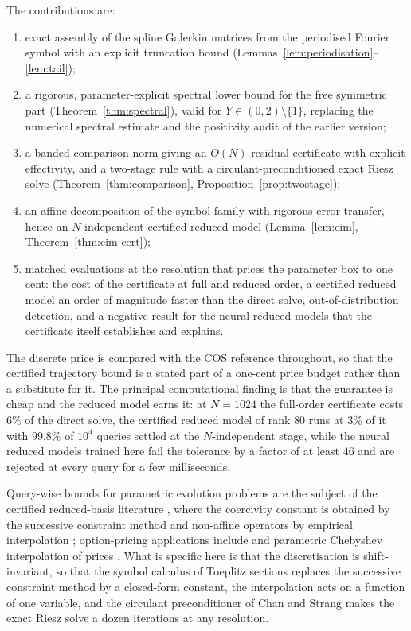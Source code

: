 \documentclass[11pt]{amsart}
\theoremstyle{remark}
\begin{document}
The contributions are:
\begin{enumerate}[leftmargin=2em]
\item exact assembly of the spline Galerkin matrices from the periodised
Fourier symbol with an explicit truncation bound (Lemmas~\ref{lem:periodisation}--\ref{lem:tail});
\item a rigorous, parameter-explicit spectral lower bound for the free symmetric part
(Theorem~\ref{thm:spectral}), valid for $Y\in(0,2)\setminus\{1\}$, replacing the
numerical spectral estimate and the positivity audit of the earlier version;
\item a banded comparison norm giving an $O(N)$ residual certificate with explicit effectivity,
and a two-stage rule with a circulant-preconditioned exact Riesz solve
(Theorem~\ref{thm:comparison}, Proposition~\ref{prop:twostage});
\item an affine decomposition of the symbol family with rigorous error transfer, hence an
$N$-independent certified reduced model (Lemma~\ref{lem:eim}, Theorem~\ref{thm:eim-cert});
\item matched evaluations at the resolution that prices the parameter box to one cent: the cost
of the certificate at full and reduced order, a certified reduced model an order of magnitude
faster than the direct solve, out-of-distribution detection, and a negative result for the neural
reduced models that the certificate itself establishes and explains.
\end{enumerate}
The discrete price is compared with the COS reference \cite{FangOosterlee2008} throughout, so that
the certified trajectory bound is a stated part of a one-cent price budget rather than a substitute
for it.
The principal computational finding is that the guarantee is cheap and the reduced model
earns it: at $N=1024$ the full-order certificate costs $6\%$ of the direct solve, the certified
reduced model of rank $80$ runs at $3\%$ of it with $99.8\%$ of $10^4$ queries settled at the
$N$-independent stage, while the neural reduced models trained here fail the tolerance by a
factor of at least $46$ and are rejected at every query for a few milliseconds.

Query-wise bounds for parametric evolution problems are the subject of the certified
reduced-basis literature \cite{GreplPatera2005,RozzaHuynhPatera2008,HaasdonkOhlberger2008},
where the coercivity constant is obtained by the successive constraint method
\cite{HuynhRozzaSenPatera2007} and non-affine operators by empirical interpolation
\cite{BarraultMadayNguyenPatera2004,GreplMadayNguyenPatera2007}; option-pricing applications
include \cite{ContLantosPironneau2011,BurkovskaHaasdonkSalomonWohlmuth2015} and parametric
Chebyshev interpolation of prices \cite{GassGlauMahlstedtMair2018}.  What is specific here is that
the discretisation is shift-invariant, so that the symbol calculus of Toeplitz sections
\cite{GrenanderSzego1958,BottcherSilbermann1999} replaces the successive constraint method by a
closed-form constant, the interpolation acts on a function of one variable, and the circulant
preconditioner of Chan and Strang \cite{ChanStrang1989} makes the exact Riesz solve a dozen
iterations at any resolution.
\end{document}
